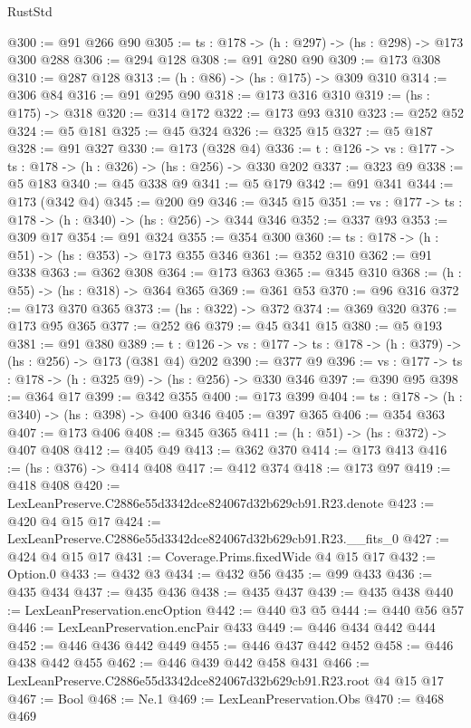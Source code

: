 \begin{lexlean}{RustStd}
\begin{coremodule}
@300 := @91 @266 @90
@305 := {ts : @178} -> (h : @297) -> (hs : @298) -> @173 @300 @288
@306 := @294 @128
@308 := @91 @280 @90
@309 := @173 @308
@310 := @287 @128
@313 := (h : @86) -> (hs : @175) -> @309 @310
@314 := @306 @84
@316 := @91 @295 @90
@318 := @173 @316 @310
@319 := (hs : @175) -> @318
@320 := @314 @172
@322 := @173 @93 @310
@323 := @252 @52
@324 := @5 @181
@325 := @45 @324
@326 := @325 @15
@327 := @5 @187
@328 := @91 @327
@330 := @173 (@328 @4)
@336 := {t : @126} -> {vs : @177} -> {ts : @178} -> (h : @326) -> (hs : @256) -> @330 @202
@337 := @323 @9
@338 := @5 @183
@340 := @45 @338 @9
@341 := @5 @179
@342 := @91 @341
@344 := @173 (@342 @4)
@345 := @200 @9
@346 := @345 @15
@351 := {vs : @177} -> {ts : @178} -> (h : @340) -> (hs : @256) -> @344 @346
@352 := @337 @93
@353 := @309 @17
@354 := @91 @324
@355 := @354 @300
@360 := {ts : @178} -> (h : @51) -> (hs : @353) -> @173 @355 @346
@361 := @352 @310
@362 := @91 @338
@363 := @362 @308
@364 := @173 @363
@365 := @345 @310
@368 := (h : @55) -> (hs : @318) -> @364 @365
@369 := @361 @53
@370 := @96 @316
@372 := @173 @370 @365
@373 := (hs : @322) -> @372
@374 := @369 @320
@376 := @173 @95 @365
@377 := @252 @6
@379 := @45 @341 @15
@380 := @5 @193
@381 := @91 @380
@389 := {t : @126} -> {vs : @177} -> {ts : @178} -> (h : @379) -> (hs : @256) -> @173 (@381 @4) @202
@390 := @377 @9
@396 := {vs : @177} -> {ts : @178} -> (h : @325 @9) -> (hs : @256) -> @330 @346
@397 := @390 @95
@398 := @364 @17
@399 := @342 @355
@400 := @173 @399
@404 := {ts : @178} -> (h : @340) -> (hs : @398) -> @400 @346
@405 := @397 @365
@406 := @354 @363
@407 := @173 @406
@408 := @345 @365
@411 := (h : @51) -> (hs : @372) -> @407 @408
@412 := @405 @49
@413 := @362 @370
@414 := @173 @413
@416 := (hs : @376) -> @414 @408
@417 := @412 @374
@418 := @173 @97
@419 := @418 @408
@420 := LexLeanPreserve.C2886e55d3342dce824067d32b629cb91.R23.denote
@423 := @420 @4 @15 @17
@424 := LexLeanPreserve.C2886e55d3342dce824067d32b629cb91.R23.__fits_0
@427 := @424 @4 @15 @17
@431 := Coverage.Prims.fixedWide @4 @15 @17
@432 := Option.{0}
@433 := @432 @3
@434 := @432 @56
@435 := @99 @433
@436 := @435 @434
@437 := @435 @436
@438 := @435 @437
@439 := @435 @438
@440 := LexLeanPreservation.encOption
@442 := @440 @3 @5
@444 := @440 @56 @57
@446 := LexLeanPreservation.encPair @433
@449 := @446 @434 @442 @444
@452 := @446 @436 @442 @449
@455 := @446 @437 @442 @452
@458 := @446 @438 @442 @455
@462 := @446 @439 @442 @458 @431
@466 := LexLeanPreserve.C2886e55d3342dce824067d32b629cb91.R23.root @4 @15 @17
@467 := Bool
@468 := Ne.{1}
@469 := LexLeanPreservation.Obs
@470 := @468 @469

\end{coremodule}
\end{lexlean}
